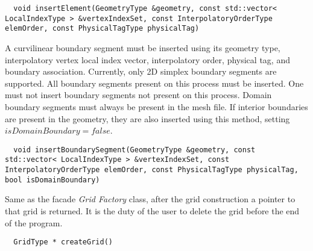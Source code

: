 \begin{mybox}
\begin{lstlisting}
  void insertElement(GeometryType &geometry, const std::vector< LocalIndexType > &vertexIndexSet, const InterpolatoryOrderType elemOrder, const PhysicalTagType physicalTag)
\end{lstlisting}
\end{mybox}


\noindent
A curvilinear boundary segment must be inserted using its geometry type, interpolatory vertex local index vector, interpolatory order, physical tag, and boundary association. Currently, only 2D simplex boundary segments are supported. All boundary segments present on this process must be inserted. One must not insert boundary segments not present on this process. Domain boundary segments must always be present in the mesh file. If interior boundaries are present in the geometry, they are also inserted using this method, setting $isDomainBoundary = false$.

\begin{mybox}
\begin{lstlisting}
  void insertBoundarySegment(GeometryType &geometry, const std::vector< LocalIndexType > &vertexIndexSet, const InterpolatoryOrderType elemOrder, const PhysicalTagType physicalTag, bool isDomainBoundary)
\end{lstlisting}
\end{mybox}


\noindent
Same as the facade \textit{Grid Factory} class, after the grid construction a pointer to that grid is returned. It is the duty of the user to delete the grid before the end of the program.

\begin{mybox}
\begin{lstlisting}
  GridType * createGrid()
\end{lstlisting}
\end{mybox}
